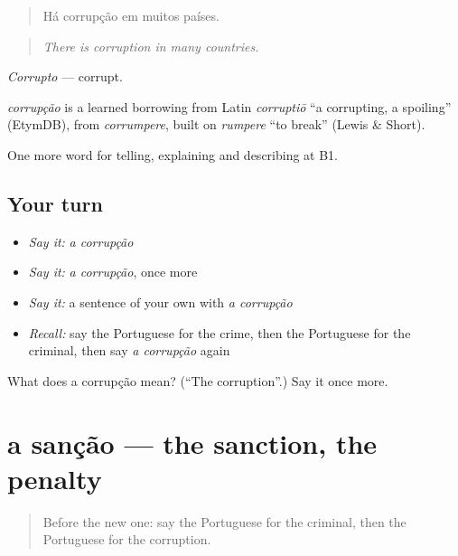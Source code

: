 \begin{quote}
Há corrupção em muitos países.
\end{quote}

\begin{quote}
\emph{There is corruption in many countries.}
\end{quote}

\emph{Corrupto} — corrupt.

\begin{cousinweb}
\emph{corrupção} is a learned borrowing from Latin \emph{corruptiō} \textquotedblleft{}a corrupting, a spoiling\textquotedblright{} (EtymDB), from \emph{corrumpere}, built on \emph{rumpere} \textquotedblleft{}to break\textquotedblright{} (Lewis \& Short).
\end{cousinweb}

\begin{grammarlens}[title={What you've built}]
One more word for telling, explaining and describing at B1.
\end{grammarlens}

\subsection*{Your turn}
\begin{itemize}
\raggedright
  \item \emph{Say it:} \emph{a corrupção}
  \item \emph{Say it:} \emph{a corrupção}, once more
  \item \emph{Say it:} a sentence of your own with \emph{a corrupção}
  \item \emph{Recall:} say the Portuguese for the crime, then the Portuguese for the criminal, then say \emph{a corrupção} again
\end{itemize}

\begin{tcolorbox}[breakable,colback=teal!4,colframe=teal!35!black,title={Before you move on}]
What does a corrupção mean? (\textquotedblleft{}The corruption\textquotedblright{}.) Say it once more.
\end{tcolorbox}
\section[a sanção]{a sanção — the sanction, the penalty}

\label{lesson:PT-C389-sancao}



\begin{quote}
Before the new one: say the Portuguese for the criminal, then the Portuguese for the corruption.
\end{quote}

